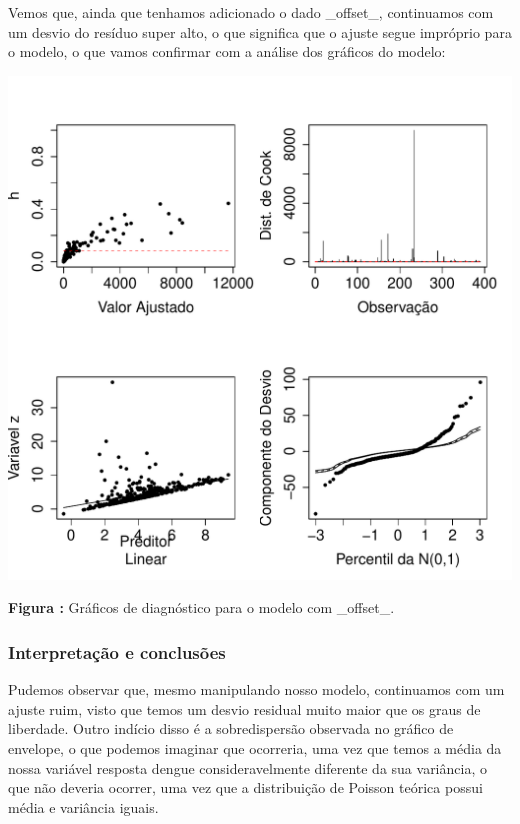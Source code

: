 \documentclass[12pt,a4paper]{article}\usepackage[]{graphicx}\usepackage[]{color}
\makeatletter
\def\maxwidth{ %
  \ifdim\Gin@nat@width>\linewidth
    \linewidth
  \else
    \Gin@nat@width
  \fi
}
\newenvironment{knitrout}{}{} %
\makeatother
\begin{document}
\newpage
Vemos que, ainda que tenhamos adicionado o dado \_offset\_, continuamos com um desvio do resíduo super alto, o que significa que o ajuste segue impróprio para o modelo, o que vamos confirmar com a análise dos gráficos do modelo:

\begin{knitrout}
\color{fgcolor}
\includegraphics[width=\maxwidth]{figure/unnamed-chunk-10-1} 

\end{knitrout}
\textbf{Figura :} Gráficos de diagnóstico para o modelo com \_offset\_.

\newpage
\subsubsection{\textbf{Interpretação e conclusões}}

Pudemos observar que, mesmo manipulando nosso modelo, continuamos com um ajuste ruim, visto que temos um desvio residual muito maior que os graus de liberdade. Outro indício disso é a sobredispersão observada no gráfico de envelope, o que podemos imaginar que ocorreria, uma vez que temos a média da nossa variável resposta dengue consideravelmente diferente da sua variância, o que não deveria ocorrer, uma vez que a distribuição de Poisson teórica possui média e variância iguais.
\end{document}
